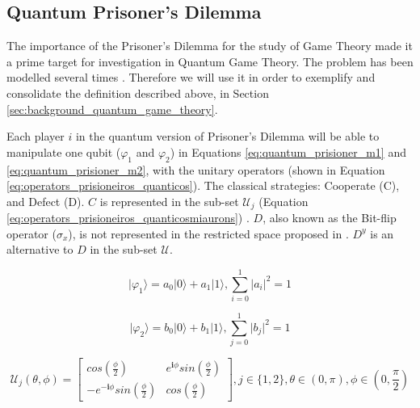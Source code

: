 \subsection{Quantum Prisoner's Dilemma}
\label{subsubsec:quantum_prisioners_dillema}

The importance of the Prisoner's Dilemma for the study of Game Theory made it a prime target for investigation in Quantum Game Theory. The problem has been modelled several times \cite{Eisert2008}\cite{Letters2002}. Therefore we will use it in order to exemplify and consolidate the definition described above, in Section \ref{sec:background_quantum_game_theory}\cite{Fra2011a}. 

Each player $i$ in the quantum version of Prisoner's Dilemma will be able to manipulate one qubit ($\varphi_{1}$ and $\varphi_{2}$) in Equations \eqref{eq:quantum_prisioner_m1} and \eqref{eq:quantum_prisioner_m2}, with the unitary operators (shown in Equation \eqref{eq:operators_prisioneiros_quanticos}). The  classical strategies: Cooperate (C), and Defect (D). $C$ is represented in the sub-set $\mathcal{U}_{j}$ (Equation \eqref{eq:operators_prisioneiros_quanticosmiaurons}) . $D$, also known as the Bit-flip operator ($\sigma_{x}$), is not represented in the restricted space proposed in \cite{Eisert2008}\cite{Fra2011a}. $D^{y}$ is an alternative to $D$ in the sub-set $\mathcal{U}$.

\begin{equation}
\vert \varphi_{1} \rangle=a_{0}\vert0\rangle+a_{1}\vert1\rangle,\sum_{i=0}^{1}\vert a_{i}\vert^{2}=1
\label{eq:quantum_prisioner_m1}
\end{equation}


\begin{equation}
\vert \varphi_{2} \rangle=b_{0}\vert0\rangle+b_{1}\vert1\rangle,\sum_{j=0}^{1}\vert b_{j}\vert^{2}=1
\label{eq:quantum_prisioner_m2}
\end{equation}

\begin{equation}
\mathcal{U}_{j} ( \theta,\phi) = \left[\begin{array}{cc}
cos(\frac{\phi}{2}) & e^{\mathbf{i}\phi}sin(\frac{\phi}{2})\\
-e^{-\mathbf{i}\phi}sin(\frac{\phi}{2}) & cos(\frac{\phi}{2})
\end{array}\right] , j \in \{ 1, 2\}, \theta \in ( 0, \pi ) , \phi \in ( 0, \frac{\pi}{2})
\label{eq:operators_prisioneiros_quanticos}
\end{equation}

